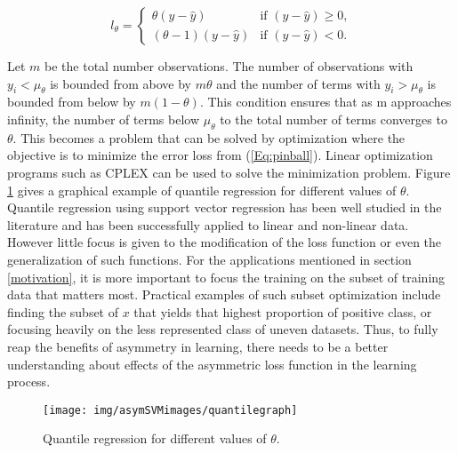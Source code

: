 \begin{equation}\label{Eq:pinball}
l_{\theta}=
\begin{cases} \theta (y-\hat{y}) & \text{if $(y-\hat{y})\geq 0$,}
\\
 (\theta - 1) (y-\hat{y})  &\text{if $(y-\hat{y})< 0$.}
\end{cases}
\end{equation}

Let $m$ be the total number observations. The number of observations with $y_i < \mu_{\theta}$ is bounded from above by $m\theta$ and the number of terms with $y_i > \mu_{\theta}$ is bounded from below by $m(1-\theta)$. This condition ensures that as m approaches infinity, the number of terms below $\mu_{\theta}$ to the total number of terms converges to $\theta$. This becomes a problem that can be solved by optimization where the objective is to minimize the error loss from (\ref{Eq:pinball}). Linear optimization programs such as CPLEX can be used to solve the minimization problem. Figure \ref{Fig:Quantile Regression} gives a graphical example of quantile regression for different values of $\theta$. Quantile regression using support vector regression has been well studied in the literature \citep{Changha05} and has been successfully applied to linear and non-linear data. However little focus is given to the modification of the loss function or even the generalization of such functions. For the applications mentioned in section \ref{motivation}, it is more important to focus the training on the subset of training data that matters most. Practical examples of such subset optimization include finding the subset of $x$ that yields that highest proportion of positive class, or focusing heavily on the less represented class of uneven datasets. Thus, to fully reap the benefits of asymmetry in learning, there needs to be a better understanding about effects of the asymmetric loss function in the learning process.
\begin{figure}
 \centering
\texttt{[image: img/asymSVMimages/quantilegraph]}\\
 \caption{Quantile regression for different values of $\theta$.}
 \label{Fig:Quantile Regression}
\end{figure}



